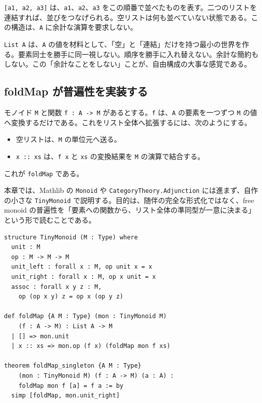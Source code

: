 \texttt{[a1, a2, a3]} は、\texttt{a1}、\texttt{a2}、\texttt{a3} をこの順番で並べたものを表す。二つのリストを連結すれば、並びをつなげられる。空リストは何も並べていない状態である。この構造は、\texttt{A} に余計な演算を要求しない。

\begin{intuitionbox}
\texttt{List A} は、\texttt{A} の値を材料として、「空」と「連結」だけを持つ最小の世界を作る。要素同士を勝手に同一視しない。順序を勝手に入れ替えない。余計な簡約もしない。この「余計なことをしない」ことが、自由構成の大事な感覚である。
\end{intuitionbox}


\subsection{foldMap が普遍性を実装する}

モノイド \texttt{M} と関数 \texttt{f : A -> M} があるとする。\texttt{f} は、\texttt{A} の要素を一つずつ \texttt{M} の値へ変換するだけである。これをリスト全体へ拡張するには、次のようにする。

\begin{itemize}
\item 空リストは、\texttt{M} の単位元へ送る。
\item \texttt{x :: xs} は、\texttt{f x} と \texttt{xs} の変換結果を \texttt{M} の演算で結合する。
\end{itemize}

これが \texttt{foldMap} である。

\begin{leanbox}
本章では、Mathlib の \texttt{Monoid} や \texttt{CategoryTheory.Adjunction} には進まず、自作の小さな \texttt{TinyMonoid} で説明する。目的は、随伴の完全な形式化ではなく、free monoid の普遍性を「要素への関数から、リスト全体の準同型が一意に決まる」という形で読むことである。
\end{leanbox}

\begin{listing}[htbp]
\begin{verbatim}
structure TinyMonoid (M : Type) where
  unit : M
  op : M -> M -> M
  unit_left : forall x : M, op unit x = x
  unit_right : forall x : M, op x unit = x
  assoc : forall x y z : M,
    op (op x y) z = op x (op y z)

def foldMap {A M : Type} (mon : TinyMonoid M)
    (f : A -> M) : List A -> M
  | [] => mon.unit
  | x :: xs => mon.op (f x) (foldMap mon f xs)

theorem foldMap_singleton {A M : Type}
    (mon : TinyMonoid M) (f : A -> M) (a : A) :
    foldMap mon f [a] = f a := by
  simp [foldMap, mon.unit_right]
\end{verbatim}
\caption{小さなモノイドと foldMap}
\label{lst:ch31_tiny_monoid}
\end{listing}

